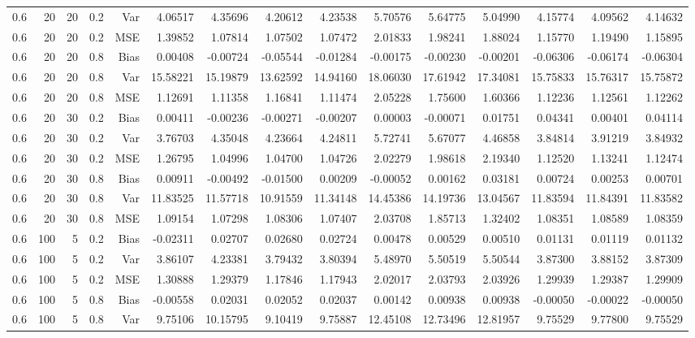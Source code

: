 \begin{table}[!htbp]
\begin{tabular}{lrrrrrrrrrrrrrr}
0.6 &  20 & 20 & 0.2 & Var & 4.06517 & 4.35696 & 4.20612 & 4.23538 & 5.70576 & 5.64775 & 5.04990 & 4.15774 & 4.09562 & 4.14632 \\
0.6 &  20 & 20 & 0.2 & MSE & 1.39852 & 1.07814 & 1.07502 & 1.07472 & 2.01833 & 1.98241 & 1.88024 & 1.15770 & 1.19490 & 1.15895 \\
0.6 &  20 & 20 & 0.8 & Bias & 0.00408 & -0.00724 & -0.05544 & -0.01284 & -0.00175 & -0.00230 & -0.00201 & -0.06306 & -0.06174 & -0.06304 \\
0.6 &  20 & 20 & 0.8 & Var & 15.58221 & 15.19879 & 13.62592 & 14.94160 & 18.06030 & 17.61942 & 17.34081 & 15.75833 & 15.76317 & 15.75872 \\
0.6 &  20 & 20 & 0.8 & MSE & 1.12691 & 1.11358 & 1.16841 & 1.11474 & 2.05228 & 1.75600 & 1.60366 & 1.12236 & 1.12561 & 1.12262 \\
0.6 &  20 & 30 & 0.2 & Bias & 0.00411 & -0.00236 & -0.00271 & -0.00207 & 0.00003 & -0.00071 & 0.01751 & 0.04341 & 0.00401 & 0.04114 \\
0.6 &  20 & 30 & 0.2 & Var & 3.76703 & 4.35048 & 4.23664 & 4.24811 & 5.72741 & 5.67077 & 4.46858 & 3.84814 & 3.91219 & 3.84932 \\
0.6 &  20 & 30 & 0.2 & MSE & 1.26795 & 1.04996 & 1.04700 & 1.04726 & 2.02279 & 1.98618 & 2.19340 & 1.12520 & 1.13241 & 1.12474 \\
0.6 &  20 & 30 & 0.8 & Bias & 0.00911 & -0.00492 & -0.01500 & 0.00209 & -0.00052 & 0.00162 & 0.03181 & 0.00724 & 0.00253 & 0.00701 \\
0.6 &  20 & 30 & 0.8 & Var & 11.83525 & 11.57718 & 10.91559 & 11.34148 & 14.45386 & 14.19736 & 13.04567 & 11.83594 & 11.84391 & 11.83582 \\
0.6 &  20 & 30 & 0.8 & MSE & 1.09154 & 1.07298 & 1.08306 & 1.07407 & 2.03708 & 1.85713 & 1.32402 & 1.08351 & 1.08589 & 1.08359 \\
0.6 & 100 &  5 & 0.2 & Bias & -0.02311 & 0.02707 & 0.02680 & 0.02724 & 0.00478 & 0.00529 & 0.00510 & 0.01131 & 0.01119 & 0.01132 \\
0.6 & 100 &  5 & 0.2 & Var & 3.86107 & 4.23381 & 3.79432 & 3.80394 & 5.48970 & 5.50519 & 5.50544 & 3.87300 & 3.88152 & 3.87309 \\
0.6 & 100 &  5 & 0.2 & MSE & 1.30888 & 1.29379 & 1.17846 & 1.17943 & 2.02017 & 2.03793 & 2.03926 & 1.29939 & 1.29387 & 1.29909 \\
0.6 & 100 &  5 & 0.8 & Bias & -0.00558 & 0.02031 & 0.02052 & 0.02037 & 0.00142 & 0.00938 & 0.00938 & -0.00050 & -0.00022 & -0.00050 \\
0.6 & 100 &  5 & 0.8 & Var & 9.75106 & 10.15795 & 9.10419 & 9.75887 & 12.45108 & 12.73496 & 12.81957 & 9.75529 & 9.77800 & 9.75529 \\

\end{tabular}
\end{table}
